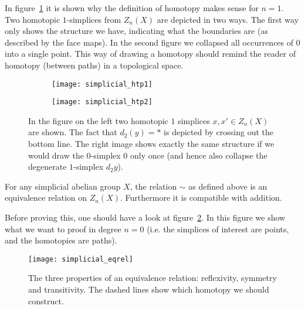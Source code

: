 In figure~\ref{fig:simplicial_htp} it is shown why the definition of homotopy makes sense for $n=1$. Two homotopic $1$-simplices from $Z_n(X)$ are depicted in two ways. The first way only shows the structure we have, indicating what the boundaries are (as described by the face maps). In the second figure we collapsed all occurrences of $0$ into a single point. This way of drawing a homotopy should remind the reader of homotopy (between paths) in a topological space.

\begin{figure}[h!]
\begin{subfigure}{.5\textwidth}
  \centering
  \texttt{[image: simplicial\_htp1]}
\end{subfigure}%
\begin{subfigure}{.5\textwidth}
  \centering
  \texttt{[image: simplicial\_htp2]}
\end{subfigure}
\caption{In the figure on the left two homotopic $1$ simplices $x, x' \in Z_n(X)$ are shown. The fact that $d_2(y) = \ast$ is depicted by crossing out the bottom line. The right image shows exactly the same structure if we would draw the $0$-simplex $0$ only once (and hence also collapse the degenerate $1$-simplex $d_2y$).}
\label{fig:simplicial_htp}
\end{figure}

\begin{lemma}
	For any simplicial abelian group $X$, the relation $\sim$ as defined above is an equivalence relation on $Z_n(X)$. Furthermore it is compatible with addition.
\end{lemma}

Before proving this, one should have a look at figure~\ref{fig:simplicial_eqrel}. In this figure we show what we want to proof in degree $n=0$ (i.e. the simplices of interest are points, and the homotopies are paths).

\begin{figure}[h!]
\texttt{[image: simplicial\_eqrel]}
\caption{The three properties of an equivalence relation: reflexivity, symmetry and transitivity. The dashed lines show which homotopy we should construct.}
\label{fig:simplicial_eqrel}
\end{figure}

